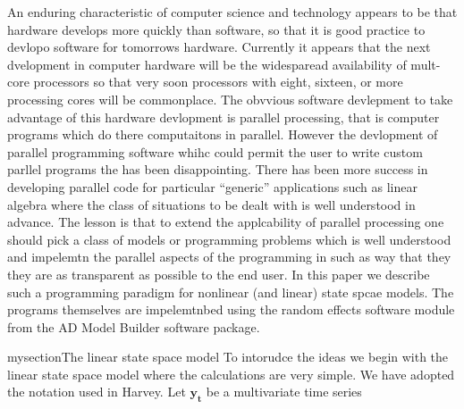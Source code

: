 %
%

\def\wha{\widehat\alpha}
An enduring characteristic of computer science and technology
appears to be that hardware develops more quickly than software,
so that it is good practice to devlopo software for tomorrows
hardware. Currently it appears that the next dvelopment in computer hardware will be the widesparead availability of mult-core processors so that very soon
processors with eight, sixteen, or more processing cores will be commonplace.
The obvvious software devlepment to take advantage of this hardware devlopment 
is parallel processing, that is computer programs which do there computaitons in parallel. However the devlopment of parallel programming software 
whihc could permit the user to write custom parllel programs the has been 
disappointing. There has been more success in developing parallel code for
particular ``generic'' applications such as linear algebra 
where the class of situations to be dealt  with is well understood in advance.
The lesson is that to extend the applcability of parallel processing 
one should pick a class of models or programming problems which is 
well understood and impelemtn the parallel aspects of the programming in such as
way that they they are as transparent as possible to the end user.
In this paper we describe such a programming paradigm for 
nonlinear (and linear) state spcae models. The programs themselves are
impelemtnbed using the random effects software module from
the AD Model Builder software package.

\def\Byt{\boldsymbol{y_t}}
mysection{The linear state space model}
To intorudce the ideas we begin with the linear state space model where the
calculations are very simple. We have adopted the  notation used in Harvey.
Let $\Byt$ be a multivariate time series

